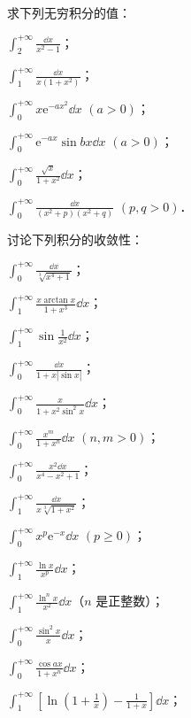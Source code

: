 \begin{xiti}
\item 求下列无穷积分的值：
\begin{ziti}
\item $\displaystyle\int_{2}^{+\infty}\frac{\dd x}{x^{2}-1}$；
\item $\displaystyle\int_{1}^{+\infty}\frac{\dd x}{x(1+x^{2})}$；
\item $\displaystyle\int_{0}^{+\infty}x\mathrm{e}^{-ax^{2}}\dd x$ $(a>0)$；
\item $\displaystyle\int_{0}^{+\infty}\mathrm{e}^{-ax}\sin bx\dd x$ $(a>0)$；
\item $\displaystyle\int_{0}^{+\infty}\frac{\sqrt{x}}{1+x^{2}}\dd x$；
\item $\displaystyle\int_{0}^{+\infty}\frac{\dd x}{\left(x^{2}+p\right)\left(x^{2}+q\right)}$ $(p,q>0)$．
\end{ziti}
\item 讨论下列积分的收敛性：
\begin{ziti}
\item $\displaystyle\int_{0}^{+\infty}\frac{\dd x}{\sqrt[3]{x^{4}+1}}$；
\item $\displaystyle\int_{1}^{+\infty}\frac{x\arctan x}{1+x^{3}}\dd x$；
\item $\displaystyle\int_{1}^{+\infty}\sin\frac{1}{x^{2}}\dd x$；
\item $\displaystyle\int_{0}^{+\infty}\frac{\dd x}{1+x\left|\sin x\right|}$；
\item $\displaystyle\int_{0}^{+\infty}\frac{x}{1+x^{2}\sin^{2}x}\dd x$；
\item $\displaystyle\int_{0}^{+\infty}\frac{x^{m}}{1+x^{n}}\dd x$ $(n,m>0)$；
\item $\displaystyle\int_{0}^{+\infty}\frac{x^{2}\dd x}{x^{4}-x^{2}+1}$；
\item $\displaystyle\int_{1}^{+\infty}\frac{\dd x}{x\sqrt[3]{1+x^{2}}}$；
\item $\displaystyle\int_{0}^{+\infty}x^{p}\mathrm{e}^{-x}\dd x$ $(p\geqslant 0)$；
\item $\displaystyle\int_{1}^{+\infty}\frac{\ln x}{x^{p}}\dd x$；
\item $\displaystyle\int_{1}^{+\infty}\frac{\ln^{n}x}{x^{2}}\dd x$（$n$ 是正整数）；
\item $\displaystyle\int_{0}^{+\infty}\frac{\sin^{2}x}{x}\dd x$；
\item $\displaystyle\int_{0}^{+\infty}\frac{\cos ax}{1+x^{n}}\dd x$；
\item $\displaystyle\int_{1}^{+\infty}\left[\ln\left(1+\frac{1}{x}\right)-\frac{1}{1+x}\right]\dd x$；

\end{ziti}
\end{xiti}
